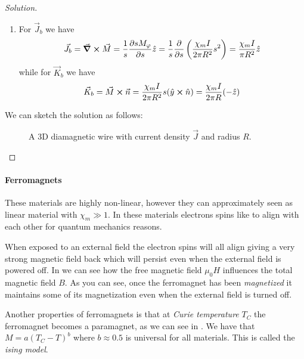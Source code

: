 \documentclass[12pt]{extarticle}
\begin{document}
\begin{proof}[Solution]
\begin{enumerate}
        \item
              For $\vec J_b$ we have
              \begin{equation}
                  \vec J_b = \curl \vec M = \frac{1}{s} \pdv{s M_\varphi}{s} \hat z = \frac{1}{s} \pdv{s} \left( \frac{\chi_m I}{2 \pi R^2} s^2 \right) = \frac{\chi_m I}{\pi R^2} \hat z
              \end{equation}
              while for $\vec K_b$ we have
              \begin{equation}
                  \vec K_b = \vec M \cross \vec n = \frac{\chi_m I}{2 \pi R^2} s (\hat y \cross \hat n) = \frac{\chi_m I}{2 \pi R}(- \hat z)
              \end{equation}
    \end{enumerate}

    We can sketch the solution as follows:
    \begin{figure}[H]
        \centering
        
        \caption{A 3D diamagnetic wire with current density $\vec J$ and radius $R$. }
    \end{figure}
\end{proof}

\paragraph{Ferromagnets}
These materials are highly non-linear, however they can approximately seen as linear material with $\chi_m \gg 1$.
In these materials electrons spins like to align with each other for quantum mechanics reasons.

When exposed to an external field the electron spins will all align giving a very strong magnetic field back
which will persist even when the external field is powered off.
In  we can see how the free magnetic field $\mu_0 H$ influences the total magnetic field $B$.
As you can see, once the ferromagnet has been \emph{magnetized} it maintains some of its magnetization
even when the external field is turned off.

Another properties of ferromagnets is that at \emph{Curie temperature} $T_C$ the ferromagnet becomes a paramagnet,
as we can see in .
We have that $M = a(T_C-T)^b$ where $b \approx 0.5$ is universal for all materials.
This is called the \emph{ising model}.
\end{document}
